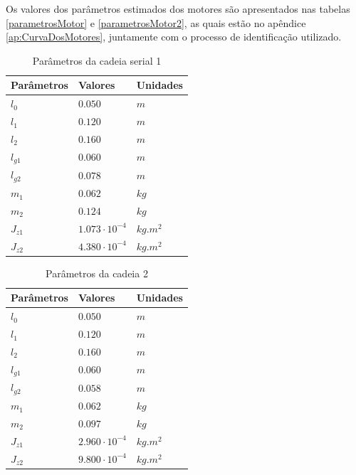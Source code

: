 \documentclass[]{politex}
\begin{document}
Os valores dos parâmetros estimados dos motores são apresentados nas tabelas \ref{parametrosMotor} e \ref{parametrosMotor2}, as quais estão no apêndice \ref{ap:CurvaDosMotores}, juntamente com o processo de identificação utilizado. 
\begin{multicols}{2}
\begin{table}[H] 
\centering
\caption{Parâmetros da cadeia serial 1}
\label{tab:parametrosCadeia1}
\begin{tabular}{l|l|l}
Parâmetros   & Valores                  & Unidades      \\ \hline
$l_0$        & $0.050$                     & $m$        \\
$l_1$        & $0.120$                     & $m$        \\
$l_2$        & $0.160$                     & $m$        \\
$l_{g1}$     & $0.060$                     & $m$        \\
$l_{g2}$     & $0.078$                    & $m$        \\
$m_1$        & $0.062$                    & $kg$       \\
$m_2$        & $0.124$                    & $kg$       \\
$J_{z1}$     & $1.073 \cdot 10^{-4}$    & $kg.m^{2}$ \\
$J_{z2}$     & $4.380 \cdot 10^{-4}$    & $kg.m^{2}$ \\
\end{tabular}
\end{table} 

\begin{table}[H] 
\centering
\caption{Parâmetros da cadeia 2}
\label{tab:parametrosCadeia2}
\begin{tabular}{l|l|l}
Parâmetros   & Valores                    & Unidades   \\ \hline
$l_0$        & $0.050$                    & $m$        \\
$l_1$        & $0.120$                    & $m$        \\
$l_2$        & $0.160$                    & $m$        \\
$l_{g1}$     & $0.060$                    & $m$        \\
$l_{g2}$     & $0.058$                    & $m$        \\
$m_1$        & $0.062$                    & $kg$       \\
$m_2$        & $0.097$                    & $kg$       \\
$J_{z1}$     & $2.960   \cdot 10^{-4}$    & $kg.m^{2}$ \\
$J_{z2}$     & $9.800   \cdot 10^{-4}$    & $kg.m^{2}$ \\
\end{tabular}
\end{table}
\end{multicols}
\end{document}
